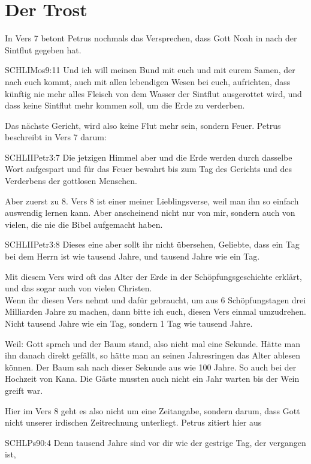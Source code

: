 \documentclass[fontsize=16pt]{mybib}
\begin{document}
\section{Der Trost}
In Vers 7 betont Petrus nochmals das Versprechen, dass Gott Noah in  nach der Sintflut gegeben hat. 
\begin{bibelbox}{SCHL}{IMos}{9:11}
Und ich will meinen Bund mit euch und mit eurem Samen, der nach euch kommt, auch mit allen lebendigen Wesen bei euch, aufrichten, dass künftig nie mehr alles Fleisch von dem Wasser der Sintflut ausgerottet wird, und dass keine Sintflut mehr kommen soll, um die Erde zu verderben.
\end{bibelbox}
Das nächste Gericht, wird also keine Flut mehr sein, sondern Feuer. Petrus beschreibt in Vers 7 darum:
\begin{bibelbox}{SCHL}{IIPetr}{3:7}
Die jetzigen Himmel aber und die Erde werden durch dasselbe Wort aufgespart und für das Feuer bewahrt bis zum Tag des Gerichts und des Verderbens der gottlosen Menschen.
\end{bibelbox}
Aber zuerst zu 8. Vers 8 ist einer meiner Lieblingsverse, weil man ihn so einfach auswendig lernen kann. Aber anscheinend nicht nur von mir, sondern auch von vielen, die nie die Bibel aufgemacht haben.
\begin{bibelbox}{SCHL}{IIPetr}{3:8}
Dieses eine aber sollt ihr nicht übersehen, Geliebte, dass ein Tag bei dem Herrn ist wie tausend Jahre, und tausend Jahre wie ein Tag.
\end{bibelbox}
Mit diesem Vers wird oft das Alter der Erde in der Schöpfungsgeschichte erklärt, und das sogar auch von vielen Christen.\\
Wenn ihr diesen Vers nehmt und dafür gebraucht, um aus 6 Schöpfungstagen drei Milliarden Jahre zu machen, dann bitte ich euch, diesen Vers einmal umzudrehen. Nicht tausend Jahre wie ein Tag, sondern 1 Tag wie tausend Jahre.

Weil: Gott sprach und der Baum stand, also nicht mal eine Sekunde. Hätte man ihn danach direkt gefällt, so hätte man an seinen Jahresringen das Alter ablesen können. Der Baum sah nach dieser Sekunde aus wie 100 Jahre. So auch bei der Hochzeit von Kana. Die Gäste mussten auch nicht ein Jahr warten bis der Wein greift war.

Hier im Vers 8 geht es also nicht um eine Zeitangabe, sondern darum, dass Gott nicht unserer irdischen Zeitrechnung unterliegt. Petrus zitiert hier aus 
\begin{bibelbox}{SCHL}{Ps}{90:4}
Denn tausend Jahre sind vor dir wie der gestrige Tag, der vergangen ist,
\end{bibelbox}
\end{document}
